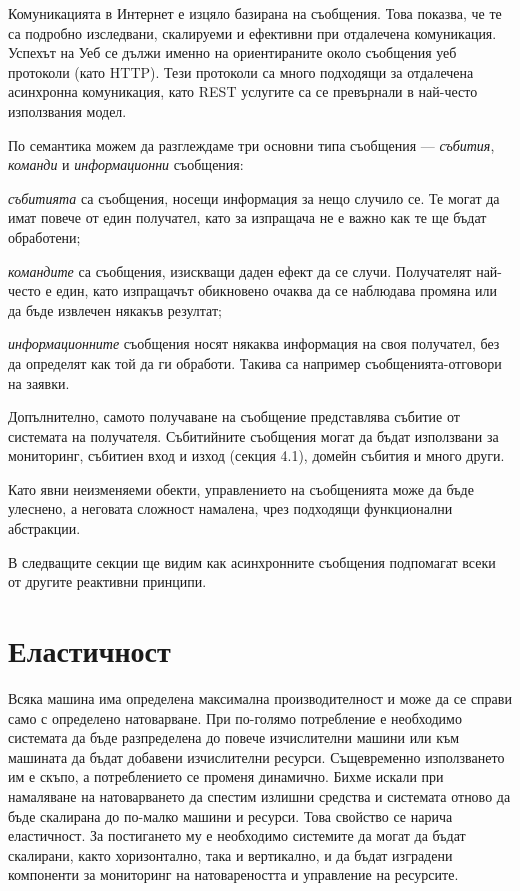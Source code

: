 Комуникацията в Интернет е изцяло базирана на съобщения. Това показва, че те са подробно изследвани, скалируеми и ефективни при отдалечена комуникация. Успехът на Уеб се дължи именно на ориентираните около съобщения уеб протоколи (като HTTP). Тези протоколи са много подходящи за отдалечена асинхронна комуникация, като REST услугите са се превърнали в най-често използвания модел.

По семантика можем да разглеждаме три основни типа съобщения — \emph{събития},  \emph{команди} и \emph{информационни} съобщения:

\begin{itemize*}
  \item \emph{събитията} са съобщения, носещи информация за нещо случило се. Те могат да имат повече от един получател, като за изпращача не е важно как те ще бъдат обработени;
  \item \emph{командите} са съобщения, изискващи даден ефект да се случи. Получателят най-често е един, като изпращачът обикновено очаква да се наблюдава промяна или да бъде извлечен някакъв резултат;
  \item \emph{информационните} съобщения носят някаква информация на своя получател, без да определят как той да ги обработи. Такива са например съобщенията-отговори на заявки.
\end{itemize*}

Допълнително, самото получаване на съобщение представлява събитие от системата на получателя. Събитийните съобщения могат да бъдат използвани за мониторинг, събитиен вход и изход (секция 4.1), домейн събития и много други.

Като явни неизменяеми обекти, управлението на съобщенията може да бъде улеснено, а неговата сложност намалена, чрез подходящи функционални абстракции.

В следващите секции ще видим как асинхронните съобщения подпомагат всеки от другите реактивни принципи.

\section{Еластичност}

Всяка машина има определена максимална производителност и може да се справи само с определено натоварване. При по-голямо потребление е необходимо системата да бъде разпределена до повече изчислителни машини или към машината да бъдат добавени изчислителни ресурси. Същевременно използването им е скъпо, а потреблението се променя динамично. Бихме искали при намаляване на натоварването да спестим излишни средства и системата отново да бъде скалирана до по-малко машини и ресурси. Това свойство се нарича еластичност. За постигането му е необходимо системите да могат да бъдат скалирани, както хоризонтално, така и вертикално, и да бъдат изградени компоненти за мониторинг на натовареността и управление на ресурсите.

